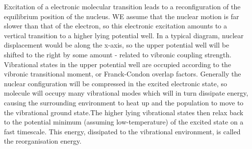 \documentclass[]{article}
\begin{document}
Excitation of a electronic molecular transition leads to a reconfiguration of the equilibrium position of the nucleus. WE assume that the nuclear motion is far slower than that of the electron, so this electronic excitation amounts to a vertical transition to a higher lying potential well. In a typical diagram, nuclear displacement would be along the x-axis, so the upper potential well will be shifted to the right by some amount - related to vibronic coupling strength. Vibrational states in the upper potential well are occupied according to the vibronic transitional moment, or Franck-Condon overlap factors. Generally the nuclear configuration will be compressed in the excited electronic state, so molecule will occupy many vibrational modes which will in turn dissipate energy, causing the surrounding environment to heat up and the population to move to the vibrational ground state.The higher lying vibrational states then relax back to the potential minimum (assuming low-temperature) of the excited state on a fast timescale. This energy, dissipated to the vibrational environment, is called the reorganisation energy.
\end{document}
